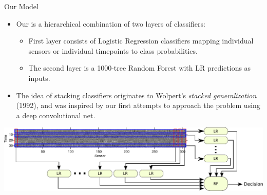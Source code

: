 \documentclass[10pt, aspectratio=169]{beamer} %
\begin{document}
\begin{frame}[fragile]{Our Model}
\begin{itemize}
\item Our is a hierarchical combination of two layers of classifiers:
\begin{itemize}
\item First layer consists of Logistic Regression classifiers mapping
individual sensors or individual timepoints to class probabilities.
\item The second layer is a 1000-tree Random Forest with LR predictions
as inputs.
\end{itemize}
\item The idea of stacking classifiers originates to Wolpert's 
\emph{stacked generalization} (1992), and was inspired by our first
attempts to approach the problem using a deep convolutional net.
\end{itemize}
\centerline{
\includegraphics[width=\columnwidth]{images/DecMegModel.pdf}
}
\end{frame}
\end{document}

